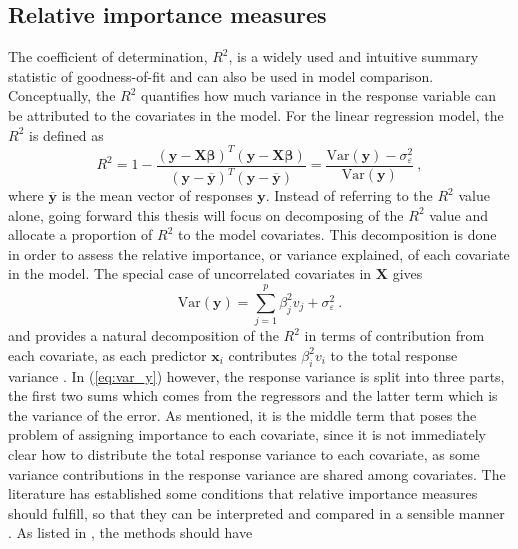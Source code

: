 \subsection{Relative importance measures}
\label{sec:rel_imp}
The coefficient of determination, $R^2$, is a widely used and intuitive summary statistic of goodness-of-fit and can also be used in model comparison. 
Conceptually, the $R^2$ quantifies how much variance in the response variable can be attributed to the covariates in the model. 
For the linear regression model, the $R^2$ is defined as
\begin{equation}
    \label{eq:R2}
    R^2 = 1 - \frac{(\mathbf{y}-\mathbf{X}\boldsymbol{\beta})^T(\mathbf{y}-\mathbf{X}\boldsymbol{\beta})}{(\mathbf{y}-\overline{\mathbf{y}})^T(\mathbf{y}-\overline{\mathbf{y}})} = \frac{\text{Var}(\mathbf{y}) - \sigma^2_{\varepsilon}}{\text{Var}(\mathbf{y})} \ ,
\end{equation}
where $\overline{\mathbf{y}}$ is the mean vector of responses $\mathbf{y}$. 
Instead of referring to the $R^2$ value alone, going forward this thesis will focus on decomposing of the $R^2$ value and allocate a proportion of $R^2$ to the model covariates. 
This decomposition is done in order to assess the relative importance, or variance explained, of each covariate in the model.
The special case of uncorrelated covariates in $\mathbf{X}$ gives 
\begin{equation}
    \label{eq:var_y_uncorrelated}
    \text{Var}(\mathbf{y}) = \sum_{j=1}^p\beta_j^2v_j + \sigma_{\varepsilon}^2 \ .
\end{equation}
and provides a natural decomposition of the $R^2$ in terms of contribution from each covariate, as each predictor $\mathbf{x}_i$ contributes $\beta_i^2v_i$ to the total response variance \citep{gromping_relaimpo}.
In (\ref{eq:var_y}) however, the response variance is split into three parts, the first two sums which comes from the regressors and the latter term which is the variance of the error. 
As mentioned, it is the middle term that poses the problem of assigning importance to each covariate, since it is not immediately clear how to distribute the total response variance to each covariate, as some variance contributions in the response variance are shared among covariates. The literature has established some conditions that relative importance measures should fulfill, so that they can be interpreted and compared in a sensible manner \citep{gromping_relaimpo}. As listed in \citet{gromping_relaimpo}, the methods should have
